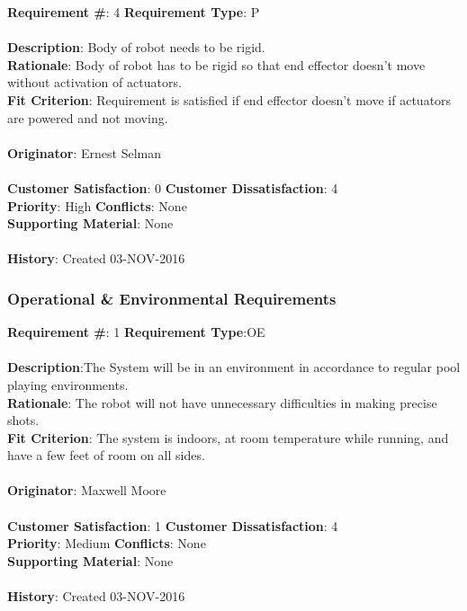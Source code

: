 \documentclass[titlepage]{article}
\begin{document}
\begin{framed}
	\noindent\textbf{Requirement \#}: 4 \hfill \textbf{Requirement Type}: P \hfill\\\\
	\noindent\textbf{Description}: Body of robot needs to be rigid. \\
	\textbf{Rationale}: Body of robot has to be rigid so that end effector doesn't move without activation of actuators. \\
	\textbf{Fit Criterion}: Requirement is satisfied if end effector doesn't move if actuators are powered and not moving.\\\\
	\textbf{Originator}: Ernest Selman\\\\
	\noindent\textbf{Customer Satisfaction}: 0 \hfill 	\textbf{Customer Dissatisfaction}: 4 \hfill\\
	\textbf{Priority}: High \hfill \textbf{Conflicts}: None \hfill\\
	\textbf{Supporting Material}: None\\\\
	\noindent\textbf{History}: Created 03-NOV-2016
\end{framed}


\subsubsection{Operational \& Environmental Requirements}
\begin{framed}
	\noindent\textbf{Requirement \#}: 1 \hfill \textbf{Requirement Type}:OE \hfill\\\\
	\noindent\textbf{Description}:The System will be in an environment in accordance to regular pool playing environments.\\
	\textbf{Rationale}: The robot will not have unnecessary difficulties in making precise shots.\\
	\textbf{Fit Criterion}: The system is indoors, at room temperature while running, and have a few feet of room on all sides.\\\\
	\textbf{Originator}: Maxwell Moore\\\\
	\noindent\textbf{Customer Satisfaction}: 1 \hfill 	\textbf{Customer Dissatisfaction}: 4 \hfill\\
	\textbf{Priority}: Medium \hfill \textbf{Conflicts}: None \hfill\\
	\textbf{Supporting Material}: None\\\\
	\noindent\textbf{History}: Created 03-NOV-2016
\end{framed}
\end{document}
